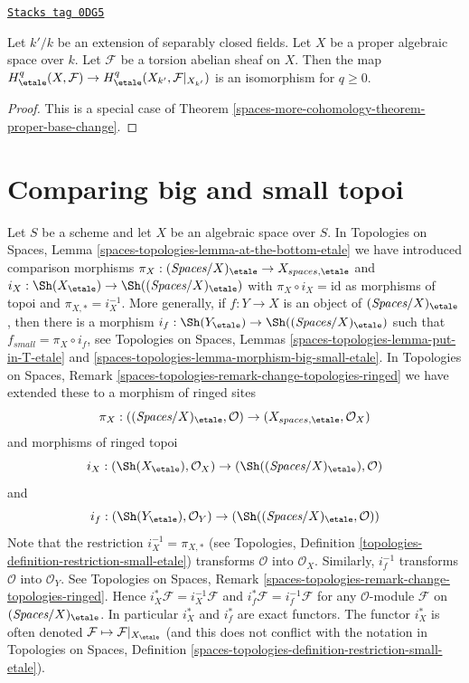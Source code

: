 \begin{lemma}
\label{spaces-more-cohomology-lemma-base-change-separably-closed}
\href{https://stacks.math.columbia.edu/tag/0DG5}{\texttt{Stacks tag 0DG5}}

Let $k'/k$ be an extension of separably closed fields.
Let $X$ be a proper algebraic space over $k$.
Let $\mathcal{F}$ be a torsion abelian sheaf on $X$.
Then the map $H^q_\etale(X, \mathcal{F}) \to
H^q_\etale(X_{k'}, \mathcal{F}|_{X_{k'}})$ is an isomorphism
for $q \geq 0$.
\end{lemma}

\begin{proof}
This is a special case of Theorem \ref{spaces-more-cohomology-theorem-proper-base-change}.
\end{proof}

\section{Comparing big and small topoi}
\label{spaces-more-cohomology-section-compare}
Let $S$ be a scheme and let $X$ be an algebraic space over $S$.
In Topologies on Spaces, Lemma
\ref{spaces-topologies-lemma-at-the-bottom-etale}
we have introduced comparison morphisms
$\pi_X : (\textit{Spaces}/X)_\etale \to X_{spaces, \etale}$ and
$i_X : \Sh(X_\etale) \to \Sh((\textit{Spaces}/X)_\etale)$
with $\pi_X \circ i_X = \text{id}$ as morphisms of topoi and
$\pi_{X, *} = i_X^{-1}$.
More generally, if $f : Y \to X$ is an object of $(\textit{Spaces}/X)_\etale$,
then there is a morphism
$i_f : \Sh(Y_\etale) \to \Sh((\textit{Spaces}/X)_\etale)$
such that $f_{small} = \pi_X \circ i_f$, see
Topologies on Spaces, Lemmas \ref{spaces-topologies-lemma-put-in-T-etale} and
\ref{spaces-topologies-lemma-morphism-big-small-etale}. In
Topologies on Spaces, Remark
\ref{spaces-topologies-remark-change-topologies-ringed}
we have extended these to a morphism of ringed sites
$$
\pi_X :
((\textit{Spaces}/X)_\etale, \mathcal{O})
\to
(X_{spaces, \etale}, \mathcal{O}_X)
$$
and morphisms of ringed topoi
$$
i_X :
(\Sh(X_\etale), \mathcal{O}_X)
\to
(\Sh((\textit{Spaces}/X)_\etale), \mathcal{O})
$$
and
$$
i_f :
(\Sh(Y_\etale), \mathcal{O}_Y)
\to
(\Sh((\textit{Spaces}/X)_\etale, \mathcal{O}))
$$
Note that the restriction $i_X^{-1} = \pi_{X, *}$ (see
Topologies, Definition \ref{topologies-definition-restriction-small-etale})
transforms $\mathcal{O}$ into $\mathcal{O}_X$.
Similarly, $i_f^{-1}$ transforms $\mathcal{O}$ into $\mathcal{O}_Y$.
See Topologies on Spaces, Remark
\ref{spaces-topologies-remark-change-topologies-ringed}.
Hence $i_X^*\mathcal{F} = i_X^{-1}\mathcal{F}$ and
$i_f^*\mathcal{F} = i_f^{-1}\mathcal{F}$ for any $\mathcal{O}$-module
$\mathcal{F}$ on $(\textit{Spaces}/X)_\etale$. In particular $i_X^*$ and $i_f^*$
are exact functors. The functor $i_X^*$ is often denoted
$\mathcal{F} \mapsto \mathcal{F}|_{X_\etale}$ (and this does not
conflict with the notation in
Topologies on Spaces, Definition
\ref{spaces-topologies-definition-restriction-small-etale}).

